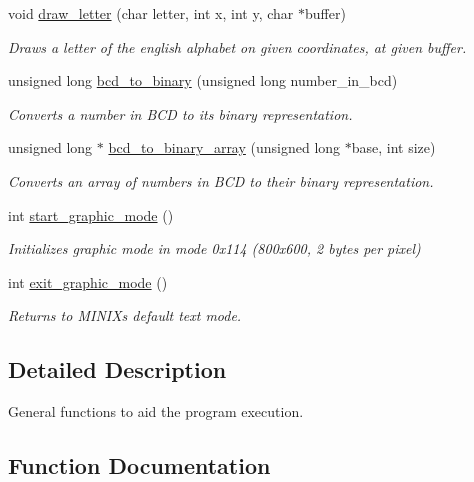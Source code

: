 \begin{DoxyCompactItemize}
void \hyperlink{group__utils_gac2e1e0cd9b6bedcac9364250a05ea853}{draw\+\_\+letter} (char letter, int x, int y, char $\ast$buffer)
\begin{DoxyCompactList}\small\item\em Draws a letter of the english alphabet on given coordinates, at given buffer. \end{DoxyCompactList}\item 
unsigned long \hyperlink{group__utils_ga85d2356c3023fbcaa278695aa20bd2b4}{bcd\+\_\+to\+\_\+binary} (unsigned long number\+\_\+in\+\_\+bcd)
\begin{DoxyCompactList}\small\item\em Converts a number in B\+CD to its binary representation. \end{DoxyCompactList}\item 
unsigned long $\ast$ \hyperlink{group__utils_ga9eb356657a418586720db2f80c1ef2b6}{bcd\+\_\+to\+\_\+binary\+\_\+array} (unsigned long $\ast$base, int size)
\begin{DoxyCompactList}\small\item\em Converts an array of numbers in B\+CD to their binary representation. \end{DoxyCompactList}\item 
int \hyperlink{group__utils_ga3bebfa53ca8923b1d684663aa409b286}{start\+\_\+graphic\+\_\+mode} ()
\begin{DoxyCompactList}\small\item\em Initializes graphic mode in mode 0x114 (800x600, 2 bytes per pixel) \end{DoxyCompactList}\item 
int \hyperlink{group__utils_ga65cd2418a6137ab0b6a403e25b098fcf}{exit\+\_\+graphic\+\_\+mode} ()
\begin{DoxyCompactList}\small\item\em Returns to M\+I\+N\+IX\textquotesingle{}s default text mode. \end{DoxyCompactList}\end{DoxyCompactItemize}


\subsection{Detailed Description}
General functions to aid the program execution. 



\subsection{Function Documentation}
\hypertarget{group__utils_ga85d2356c3023fbcaa278695aa20bd2b4}{}\label{group__utils_ga85d2356c3023fbcaa278695aa20bd2b4} 
